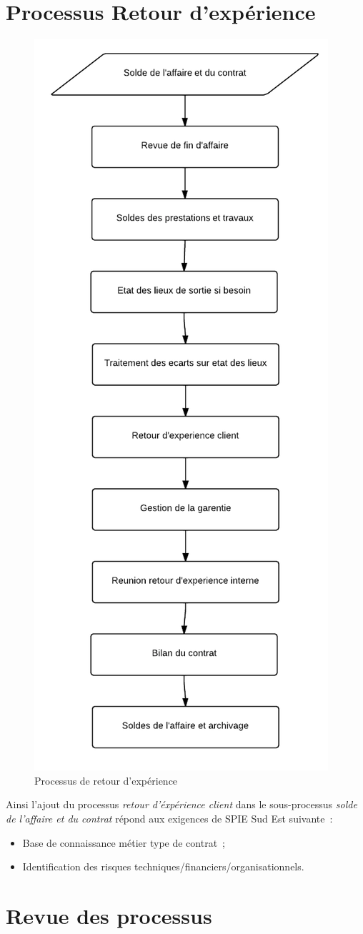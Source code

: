 \section{Processus Retour d'expérience}

\begin{figure}[h!]
	\centering
	\includegraphics[width=0.45\linewidth]{images/processus_retour_experience.png}
	\caption{Processus de retour d’expérience}
	\label{fig:processusRetourExperience}
\end{figure}

Ainsi l'ajout du processus \textit{retour d'\'exp\'erience client} dans le sous-processus \textit{solde
de l'affaire et du contrat} r\'epond aux exigences de SPIE Sud Est suivante~:

\begin{itemize}
    \item Base de connaissance m\'etier type de contrat~;
    \item Identification des risques techniques/financiers/organisationnels.
\end{itemize}


\section{Revue des processus}

